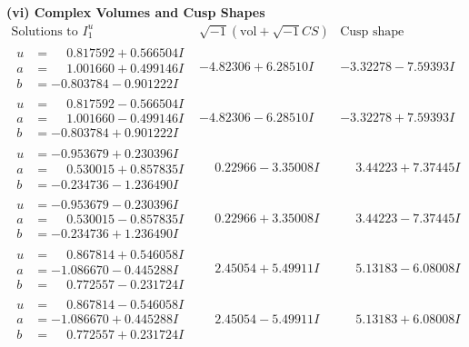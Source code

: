 \documentclass[1p]{elsarticle_modified}
\theoremstyle{definition}
\newcommand{\I}{\sqrt{-1}}
\begin{document}
\newpage\flushleft \textbf{(vi) Complex Volumes and Cusp Shapes}
$$\begin{array}{c|c|c}  
\text{Solutions to }I^u_{1}& \I (\text{vol} + \sqrt{-1}CS) & \text{Cusp shape}\\
 \hline 
\begin{aligned}
u &= \phantom{-}0.817592 + 0.566504 I \\
a &= \phantom{-}1.001660 + 0.499146 I \\
b &= -0.803784 - 0.901222 I\end{aligned}
 & -4.82306 + 6.28510 I & -3.32278 - 7.59393 I \\ \hline\begin{aligned}
u &= \phantom{-}0.817592 - 0.566504 I \\
a &= \phantom{-}1.001660 - 0.499146 I \\
b &= -0.803784 + 0.901222 I\end{aligned}
 & -4.82306 - 6.28510 I & -3.32278 + 7.59393 I \\ \hline\begin{aligned}
u &= -0.953679 + 0.230396 I \\
a &= \phantom{-}0.530015 + 0.857835 I \\
b &= -0.234736 - 1.236490 I\end{aligned}
 & \phantom{-}0.22966 - 3.35008 I & \phantom{-}3.44223 + 7.37445 I \\ \hline\begin{aligned}
u &= -0.953679 - 0.230396 I \\
a &= \phantom{-}0.530015 - 0.857835 I \\
b &= -0.234736 + 1.236490 I\end{aligned}
 & \phantom{-}0.22966 + 3.35008 I & \phantom{-}3.44223 - 7.37445 I \\ \hline\begin{aligned}
u &= \phantom{-}0.867814 + 0.546058 I \\
a &= -1.086670 - 0.445288 I \\
b &= \phantom{-}0.772557 - 0.231724 I\end{aligned}
 & \phantom{-}2.45054 + 5.49911 I & \phantom{-}5.13183 - 6.08008 I \\ \hline\begin{aligned}
u &= \phantom{-}0.867814 - 0.546058 I \\
a &= -1.086670 + 0.445288 I \\
b &= \phantom{-}0.772557 + 0.231724 I\end{aligned}
 & \phantom{-}2.45054 - 5.49911 I & \phantom{-}5.13183 + 6.08008 I \\ \hline\begin{aligned}

\end{aligned}
\end{array}$$
\end{document}
